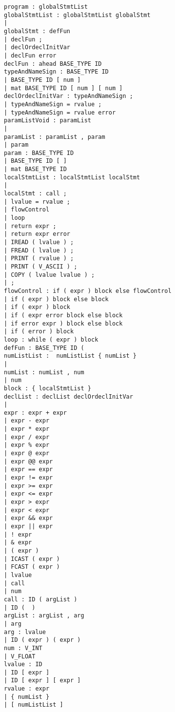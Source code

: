 
\begin{lstlisting}[texcl=true]
program : globalStmtList 
globalStmtList : globalStmtList globalStmt
| 
globalStmt : defFun 
| declFun ; 
| declOrdeclInitVar
| declFun error
declFun : ahead BASE_TYPE ID 
typeAndNameSign : BASE_TYPE ID 
| BASE_TYPE ID [ num ] 
| mat BASE_TYPE ID [ num ] [ num ] 
declOrdeclInitVar : typeAndNameSign ;
| typeAndNameSign = rvalue ; 
| typeAndNameSign = rvalue error
paramListVoid : paramList 
| 
paramList : paramList , param 
| param 
param : BASE_TYPE ID 
| BASE_TYPE ID [ ] 
| mat BASE_TYPE ID 
localStmtList : localStmtList localStmt 
| 
localStmt : call ; 
| lvalue = rvalue ;  
| flowControl 
| loop 
| return expr ; 
| return expr error
| IREAD ( lvalue ) ; 
| FREAD ( lvalue ) ; 
| PRINT ( rvalue ) ; 
| PRINT ( V_ASCII ) ; 
| COPY ( lvalue lvalue ) ; 
| ; 
flowControl : if ( expr ) block else flowControl 
| if ( expr ) block else block 
| if ( expr ) block 
| if ( expr error block else block 
| if error expr ) block else block 
| if ( error ) block 
loop : while ( expr ) block 
defFun : BASE_TYPE ID (
numListList :  numListList { numList } 
| 
numList : numList , num 
| num 
block : { localStmtList } 
declList : declList declOrdeclInitVar 
| 
expr : expr + expr 
| expr - expr 
| expr * expr 
| expr / expr 
| expr % expr 
| expr @ expr 
| expr @@ expr 
| expr == expr 
| expr != expr 
| expr >= expr 
| expr <= expr 
| expr > expr 
| expr < expr 
| expr && expr 
| expr || expr 
| ! expr 
| & expr 
| ( expr ) 
| ICAST ( expr ) 
| FCAST ( expr ) 
| lvalue
| call 
| num 
call : ID ( argList ) 
| ID (  ) 
argList : argList , arg 
| arg 
arg : lvalue 
| ID ( expr ) ( expr ) 
num : V_INT 
| V_FLOAT 
lvalue : ID 
| ID [ expr ] 
| ID [ expr ] [ expr ] 
rvalue : expr
| { numList } 
| [ numListList ]

\end{lstlisting}
